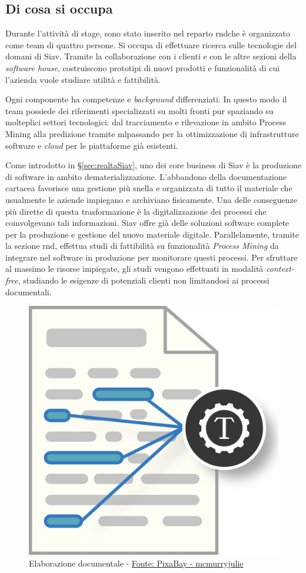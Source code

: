 \subsection{Di cosa si occupa}
\label{subsec:occupazioneRnd}
Durante l'attività di stage, sono stato inserito nel reparto \acrshort{rnd}\glsfirstoccur che è organizzato come team di quattro persone. Si occupa di effettuare ricerca sulle tecnologie del domani di Siav. Tramite la collaborazione con i clienti e con le altre sezioni della \textit{software house}, costruiscono prototipi di nuovi prodotti e funzionalità di cui l'azienda vuole studiare utilità e fattibilità.

Ogni componente ha competenze e \textit{background} differenziati. In questo modo il team possiede dei riferimenti specializzati su molti fronti pur spaziando su molteplici settori tecnologici: dal tracciamento e rilevazione in ambito Process Mining alla predizione tramite \acrlong{ml}\glsfirstoccur passando per la ottimizzazione di infrastrutture software e \textit{cloud} per le piattaforme già esistenti.

Come introdotto in \S \ref{sec:realtaSiav}, uno dei core business di Siav è la produzione di software in ambito dematerializzazione. L'abbandono della documentazione cartacea favorisce una gestione più snella e organizzata di tutto il materiale che usualmente le aziende impiegano e archiviano fisicamente. Una delle conseguenze più dirette di questa trasformazione è la digitalizzazione dei processi che coinvolgevano tali informazioni. Siav offre già delle soluzioni software complete per la produzione e gestione del nuovo materiale digitale. Parallelamente, tramite la sezione \acrshort{rnd}, effettua studi di fattibilità su funzionalità \textit{Process Mining} da integrare nel software in produzione per monitorare questi processi. Per sfruttare al massimo le risorse impiegate, gli studi vengono effettuati in modalità \textit{context-free}, studiando le esigenze di potenziali clienti non limitandosi ai processi documentali.
\begin{figure}[H] 
    \centering 
    \includegraphics[width=0.45\columnwidth]{immagini/text-mining.png} 
    \caption{Elaborazione documentale - \href{https://pixabay.com/it/users/mcmurryjulie-2375405/?utm_source=link-attribution&amp;utm_medium=referral&amp;utm_campaign=image&amp;utm_content=1476780}{Fonte: PixaBay - mcmurryjulie}}
\end{figure}

